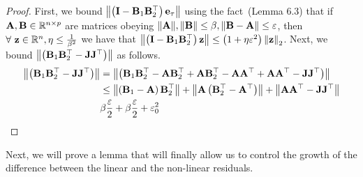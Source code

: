 \documentclass[a4paper]{article}
\let\temp\epsilon
\let\epsilon\varepsilon
\let\varepsilon\temp
\begin{document}
\begin{proof}
  First, we bound $\mathrm{\left\lVert\left({{\mathbf{I}} -
      {\mathbf{B}}_1{\mathbf{B}}_2^\top}\right){\mathbf{e}}_\tau\right\rVert}$
  using the fact~(Lemma 6.3) that if
  ${\mathbf{A}},{\mathbf{B}}\in\mathbb{R}^{n\times p}$
  are matrices obeying
  $\norm{\vec{A}},\norm{\vec{B}}\le\beta,\norm{\vec{B}-\vec{A}}\le\epsilon$,
  then
  $\forall~{\mathbf{z}}\in\mathbb{R}^n,\eta\le\frac{1}{\beta^2}$
  we have that $\norm{\br{\vec{I} -
      \vec{B}_1\vec{B}_2^\top}\vec{z}}\le\br{1+\eta\epsilon^2}\norm{\vec{z}}_2$.
  Next, we bound $\mathrm{\left\lVert\left({{\mathbf{B}}_1{\mathbf{B}}_2^\top
                                    -
                                    {\mathbf{J}}{\mathbf{J}}^\top}\right)\right\rVert}$
                                as follows.
                                \begin{align*}
                                  \norm{\br{\vec{B}_1\vec{B}_2^\top
                                    -
                                    \vec{J}\vec{J}^\top}} &= \norm{\br{\vec{B}_1\vec{B}_2^\top
                                    -\vec{A}\vec{B}_2^\top +
                                                            \vec{A}\vec{B}_2^\top
                                                            - \vec{A}\vec{A}^\top
                                                            + \vec{A}\vec{A}^\top
                                                            - \vec{J}\vec{J}^\top}}\\
                                                          &\le \norm{\br{\vec{B}_1
                                    -\vec{A}}\vec{B}_2^\top} +
                                                            \norm{\vec{A}\br{\vec{B}_2^\top
                                                            - \vec{A}^\top}}
                                                            + \norm{\vec{A}\vec{A}^\top
                                                            -
                                                            \vec{J}\vec{J}^\top}\\
                                                          &\beta\dfrac{\epsilon}{2}
                                                            +
                                                            \beta\dfrac{\epsilon}{2}
                                                            + \epsilon_0^2
                                \end{align*}
\end{proof}

Next, we will prove a lemma that will finally allow us to control the
growth of the difference between the linear and the non-linear
residuals.
\end{document}
